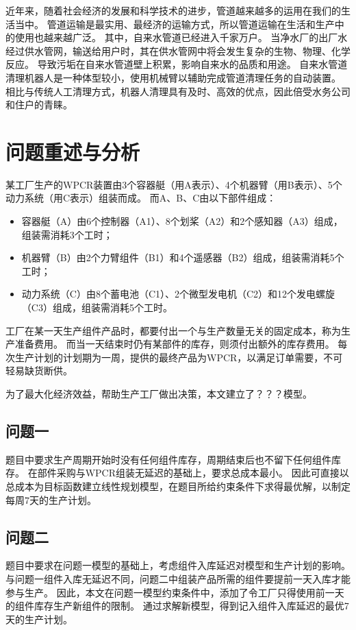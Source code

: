 近年来，随着社会经济的发展和科学技术的进步，管道越来越多的运用在我们的生活当中。
管道运输是最实用、最经济的运输方式，所以管道运输在生活和生产中的使用也越来越广泛\cite{智能管道清理机器人}。
其中，自来水管道已经进入千家万户。
当净水厂的出厂水经过供水管网，输送给用户时，其在供水管网中将会发生复杂的生物、物理、化学反应\cite{基于升力法的贯流式水轮机叶片设计及可行性分析}。
导致污垢在自来水管道壁上积累，影响自来水的品质和用途。
自来水管道清理机器人是一种体型较小，使用机械臂以辅助完成管道清理任务的自动装置。
相比与传统人工清理方式，机器人清理具有及时、高效的优点，因此倍受水务公司和住户的青睐。

\section{问题重述与分析}
某工厂生产的WPCR装置由3个容器艇（用A表示）、4个机器臂（用B表示）、5个动力系统（用C表示）组装而成。
而A、B、C由以下部件组成：
\begin{itemize}
\item 容器艇（A）由6个控制器（A1）、8个划桨（A2）和2个感知器（A3）组成，组装需消耗3个工时；
\item 机器臂（B）由2个力臂组件（B1）和4个遥感器（B2）组成，组装需消耗5个工时；
\item 动力系统（C）由8个蓄电池（C1）、2个微型发电机（C2）和12个发电螺旋（C3）组成，组装需消耗5个工时。
\end{itemize}

工厂在某一天生产组件产品时，都要付出一个与生产数量无关的固定成本，称为生产准备费用。
而当一天结束时仍有某部件的库存，则须付出额外的库存费用。
每次生产计划的计划期为一周，提供的最终产品为WPCR，以满足订单需要，不可轻易缺货断供。

为了最大化经济效益，帮助生产工厂做出决策，本文建立了？？？模型。

\subsection{问题一}
题目中要求生产周期开始时没有任何组件库存，周期结束后也不留下任何组件库存。
在部件采购与WPCR组装无延迟的基础上，要求总成本最小。
因此可直接以总成本为目标函数建立线性规划模型，在题目所给约束条件下求得最优解，以制定每周7天的生产计划。


\subsection{问题二}
题目中要求在问题一模型的基础上，考虑组件入库延迟对模型和生产计划的影响。
与问题一组件入库无延迟不同，问题二中组装产品所需的组件要提前一天入库才能参与生产。
因此，本文在问题一模型约束条件中，添加了令工厂只得使用前一天的组件库存生产新组件的限制。
通过求解新模型，得到记入组件入库延迟的最优7天的生产计划。

